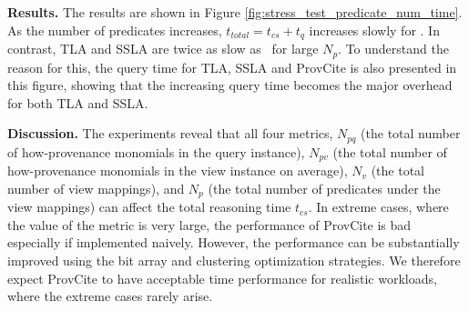 \textbf{Results.} The results are shown in Figure \ref{fig:stress_test_predicate_num_time}. As the number of predicates increases, $t_{total}=t_{cs} + t_q$
increases slowly for \provalg. In contrast, TLA and SSLA are twice as slow as \provalg\ for large $N_p$. To understand the reason for this, the query time for TLA, SSLA and ProvCite is also presented in this figure, showing that the increasing query time becomes the major overhead for both TLA and SSLA. %

{\bf Discussion.} The experiments reveal that all four metrics, $N_{pq}$ (the total number of how-provenance monomials in the query instance), $N_{pv}$ (the total number of how-provenance monomials in the view instance on average), $N_v$ (the total number of view mappings), and $N_p$ (the total number of predicates under the view mappings) can affect the total reasoning time $t_{cs}$. In extreme cases, where the value of the metric is very large, the performance of ProvCite is bad especially if implemented naively. However, the performance can be substantially improved using the bit array and clustering optimization strategies. We therefore expect ProvCite to have acceptable time performance for realistic workloads, where the extreme cases rarely arise. 

